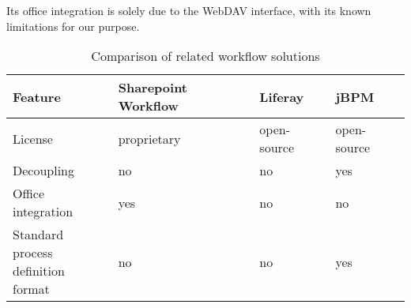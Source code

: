 Its office integration is solely due to the WebDAV interface, with its known
limitations for our purpose.

\begin{table}[H]
  \begin{center}
    \begin{tabular}{| l | l | l | l |}
    \hline
    \textbf{Feature} & \textbf{Sharepoint Workflow} & \textbf{Liferay} & \textbf{jBPM} \\ \hline
    License          & proprietary                  & open-source      & open-source \\ \hline
    Decoupling       & no                           & no               & yes \\ \hline
    Office integration & yes                        & no               & no \\ \hline
    \makecell[l]{Standard process \\ definition format} & no & no      & yes \\ \hline
    \end{tabular}
  \end{center}
  \caption{Comparison of related workflow solutions}
  \label{tab:related-wf-cmp}
\end{table}

